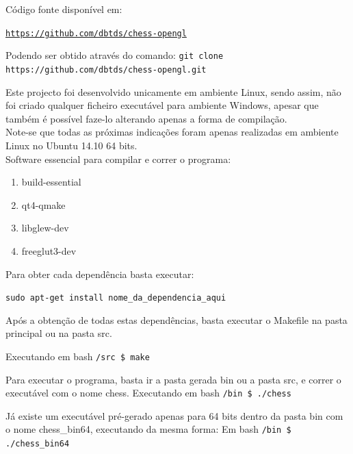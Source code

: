\documentclass[portugues,final]{revdetua}
\begin{document}
Código fonte disponível em:

{\tt \url{https://github.com/dbtds/chess-opengl}}

Podendo ser obtido através do comando: {\tt git clone https://github.com/dbtds/chess-opengl.git}

Este projecto foi desenvolvido unicamente em ambiente Linux, sendo assim, não foi criado qualquer ficheiro executável para ambiente Windows, apesar que também é possível faze-lo alterando apenas a forma de compilação.\\

Note-se que todas as próximas indicações foram apenas realizadas em ambiente Linux no Ubuntu 14.10 64 bits.\\

Software essencial para compilar e correr o programa:
\begin{enumerate}
\item build-essential
\item qt4-qmake
\item libglew-dev
\item freeglut3-dev
\end{enumerate}

Para obter cada dependência basta executar:

{\tt sudo apt-get install nome\_da\_dependencia\_aqui}

Após a obtenção de todas estas dependências, basta executar o Makefile na pasta principal ou na pasta src.

Executando em bash {\tt /src \$ make}

Para executar o programa, basta ir a pasta gerada bin ou a pasta src, e correr o executável com o nome chess.
Executando em bash {\tt /bin \$ ./chess}

Já existe um executável pré-gerado apenas para 64 bits dentro da pasta bin com o nome chess\_bin64, executando da mesma forma:
Em bash {\tt /bin \$ ./chess\_bin64}


\end{document}
